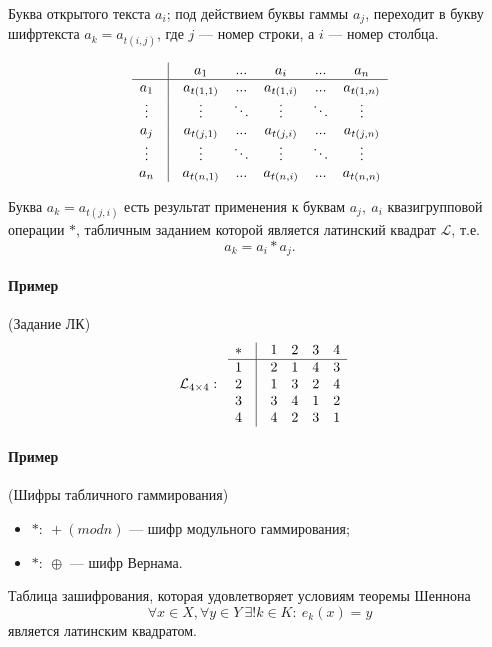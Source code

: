 \documentclass[a4paper,12pt]{article}
\begin{document}
Буква открытого текста $a_i$; под действием буквы гаммы $a_j$, переходит в букву
шифртекста $a_k = a_{t(i,j)}$, где $j$ --- номер строки, а $i$ --- номер столбца.

$$
\begin{matrix}
			& \vline & a_1 			& ... 	& a_i 		& ... & a_n \\
	\hline 
	a_1		& \vline & a_{t(1,1)} 	& ... 	& a_{t(1,i)} & ... & a_{t(1,n)} \\
	\vdots 	& \vline &\vdots 		&\ddots &\vdots 	&\ddots &\vdots \\
	a_j		& \vline & a_{t(j,1)} 	& ... 	& a_{t(j,i)} & ... & a_{t(j,n)} \\
	\vdots 	& \vline &\vdots 		&\ddots &\vdots 	&\ddots &\vdots \\
	a_n		& \vline & a_{t(n,1)} 	& ... 	& a_{t(n,i)} & ... & a_{t(n,n)} \\
\end{matrix}
$$

Буква $a_k = a_{t(j,i)}$ есть результат применения к буквам $a_j, ~ a_i$ квазигрупповой операции $*$, табличным заданием которой является латинский квадрат $\mathcal{L}$, т.е.
$$
a_k = a_i * a_j.
$$

\paragraph{Пример}(Задание ЛК)
$$\mathcal{L}_{4 \times 4}:~~~
\begin{matrix}
	*&\vline&1&2&3&4 \\
	 \hline 
	1&\vline&2&1&4&3 \\
	2&\vline&1&3&2&4 \\
	3&\vline&3&4&1&2 \\
	4&\vline&4&2&3&1
\end{matrix}
$$

\paragraph{Пример} (Шифры табличного гаммирования)
\begin{itemize}
	\item $*: ~ + (mod n)$ --- шифр модульного гаммирования;
	\item $*: ~ \oplus$ --- шифр Вернама. \\
\end{itemize}

Таблица зашифрования, которая удовлетворяет условиям теоремы Шеннона 
$$
\forall x \in X, \forall y \in Y ~ \exists! k \in K: ~ e_k(x) = y
$$
является латинским квадратом.
\end{document}
